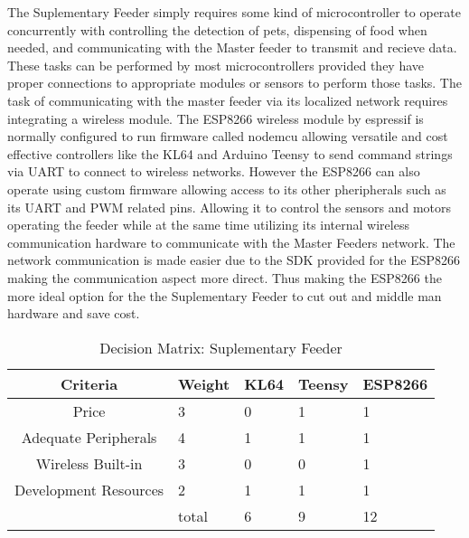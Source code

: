 \documentclass[12pt]{article}
\begin{document}
The Suplementary Feeder simply requires some kind of microcontroller to operate concurrently with controlling the
detection of pets, dispensing of food when needed, and communicating with the Master feeder to transmit and recieve data.
These tasks can be performed by most microcontrollers provided they have proper connections to appropriate modules or sensors
to perform those tasks.  The task of communicating with the master feeder via its localized network requires integrating a
wireless module.  The ESP8266 wireless module by espressif is normally configured to run firmware called nodemcu allowing
versatile and cost effective controllers like the KL64 and Arduino Teensy to send command strings via UART to connect to
wireless networks.  However the ESP8266 can also operate using custom firmware allowing access to its other pheripherals
such as its UART and PWM related pins.  Allowing it to control the sensors and motors operating the feeder while at the
same time utilizing its internal wireless communication hardware to communicate with the Master Feeders network.  The network
communication is made easier due to the SDK provided for the ESP8266 making the communication aspect more direct.  Thus making
the ESP8266 the more ideal option for the the Suplementary Feeder to cut out and middle man hardware and save cost.

\begin{table}[H]
    \centering
    \caption{Decision Matrix: Suplementary Feeder}
    \label{tab:specs3}
    \begin{tabularx}{\linewidth}{cXXXX} \toprule
        Criteria & Weight & KL64 & Teensy & ESP8266\\ \midrule
        Price                 & 3 & 0 & 1 & 1 \\
        Adequate Peripherals  & 4 & 1 & 1 & 1 \\
        Wireless Built-in     & 3 & 0 & 0 & 1 \\
        Development Resources & 2 & 1 & 1 & 1 \\
        & total                   & 6 & 9 & 12
    \end{tabularx}
\end{table}

\end{document}
